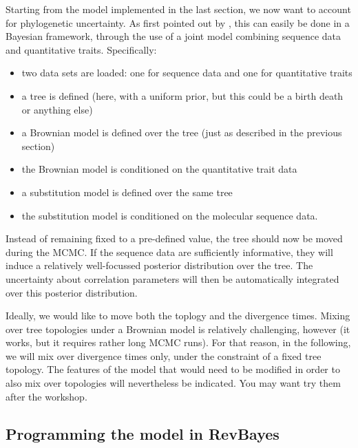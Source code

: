 \documentclass[usletter]{article}
\begin{document}
Starting from the model implemented in the last section, we now want to account for phylogenetic uncertainty. As first pointed out by \cite{Huelsenbeck:2003p999}, this can easily be done in a Bayesian framework, through the use of a joint model combining sequence data and quantitative traits. Specifically:
\begin{itemize}
\item
two data sets are loaded: one for sequence data and one for quantitative traits
\item
a tree is defined (here, with a uniform prior, but this could be a birth death or anything else)
\item
a Brownian model is defined over the tree (just as described in the previous section)
\item
the Brownian model is conditioned on the quantitative trait data
\item
a substitution model is defined over the same tree
\item
the substitution model is conditioned on the molecular sequence data.
\end{itemize}
Instead of remaining fixed to a pre-defined value,
the tree should now be moved during the MCMC.
If the sequence data are sufficiently informative, they will induce a relatively well-focussed posterior distribution
over the tree.
The uncertainty about correlation parameters
will then be automatically integrated over this posterior distribution.

Ideally, we would like to move both the toplogy and the divergence times.
Mixing over tree topologies under a Brownian model is relatively challenging, however
(it works, but it requires rather long MCMC runs).
For that reason, in the following, we will mix over divergence times only,
under the constraint of a fixed tree topology.
The features of the model that would need to be modified in order to also mix over topologies
will nevertheless be indicated. You may want try them after the workshop.

\subsection*{Programming the model in RevBayes}
\end{document}
